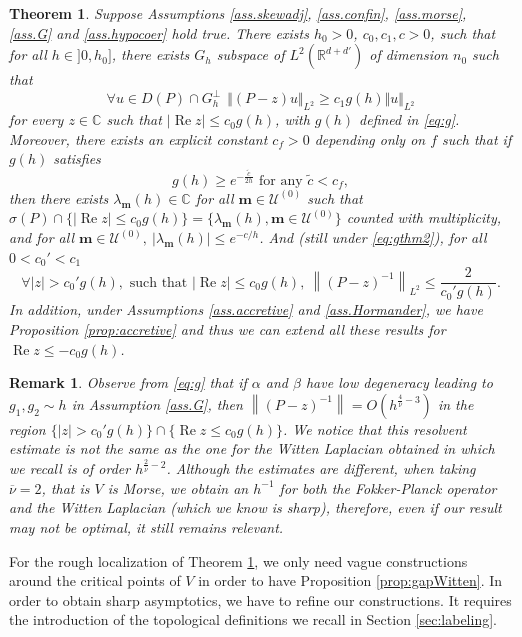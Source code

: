 \documentclass[12pt]{amsart}
\renewcommand{\Re}{\operatorname{Re}}
\newcommand{\C}{\mathbb C}
\newcommand{\R}{\mathbb R}
\numberwithin{equation}{section}
\numberwithin{figure}{section}
\def\m{\mathbf{m}}
\newcommand{\vvert}[1]{\left\lVert#1\right\rVert}
\newtheorem{theorem}{Theorem}
\newtheorem{remark}[defin]{Remark}
\def\uuu{{\mathcal U}}\def\vvv{{\mathcal V}}\def\www{{\mathcal W}}\def\xxx{{\mathcal X}}
\begin{document}
\begin{theorem}\label{thm:1}
Suppose Assumptions \ref{ass.skewadj}, \ref{ass.confin}, \ref{ass.morse}, \ref{ass.G} and \ref{ass.hypocoer} hold true. There exists $h_0>0$, $c_0,c_1,c>0$, such that for all $h\in]0,h_0]$, there exists $G_h$ subspace of $L^2(\R^{d+d'})$ of dimension $n_0$ such that
$$
\forall u\in D(P)\cap G_h^\bot\ \ \Vert (P-z)u\Vert_{L^2}\geq c_1g(h)\Vert u\Vert_{L^2}
$$
for every $z\in\C$ such that $|\Re z|\leq c_0g(h)$, with $g(h)$ defined in \eqref{eq:g}. Moreover, there exists an explicit constant $c_f>0$ depending only on $f$ such that if $g(h)$ satisfies
\begin{equation}\label{eq:gthm2}
g(h)\geq e^{-\frac{\tilde c}{2h}}\mbox{ for any } \tilde c<c_f,
\end{equation}
then there exists $\lambda_\m(h)\in\C$ for all $\m\in\uuu^{(0)}$ such that $\sigma(P)\cap\{|\Re z|\leq c_0g(h)\}=\{\lambda_\m(h),\m\in\uuu^{(0)}\}$ counted with multiplicity, and for all $\m\in\uuu^{(0)},\ |\lambda_\m(h)|\leq e^{-c/h}$. And (still under \eqref{eq:gthm2}), for all $0<c_0'<c_1$
\begin{equation*}
\forall |z|>c_0'g(h),\mbox{ such that }|\Re z|\leq c_0g(h),\ \vvert{(P-z)^{-1}}_{L^2}\leq\frac{2}{c_0'g(h)}.
\end{equation*}
In addition, under Assumptions \ref{ass.accretive} and \ref{ass.Hormander}, we have Proposition \ref{prop:accretive} and thus we can extend all these results for $\Re z \leq -c_0g(h)$.
\end{theorem}

\begin{remark}
    Observe from \eqref{eq:g} that if $\alpha$ and $\beta$ have low degeneracy leading to $g_1,g_2\sim h$ in Assumption \ref{ass.G}, then $\vvert{(P-z)^{-1}} = O(h^{\frac{4}{\overline{\nu}}-3})$ in the region $\{|z|>c_0'g(h)\}\cap\{\Re z\leq c_0g(h)\}$. We notice that this resolvent estimate is not the same as the one for the Witten Laplacian obtained in \cite{De25_1} which we recall is of order $h^{\frac{2}{\overline{\nu}}-2}$. Although the estimates are different, when taking $\overline{\nu} = 2$, that is $V$ is Morse, we obtain an $h^{-1}$ for both the Fokker-Planck operator and the Witten Laplacian (which we know is sharp), therefore, even if our result may not be optimal, it still remains relevant.
\end{remark}

For the rough localization of Theorem \ref{thm:1}, we only need vague constructions around the critical points of $V$ in order to have Proposition \ref{prop:gapWitten}. In order to obtain sharp asymptotics, we have to refine our constructions. It requires the introduction of the topological definitions we recall in Section \ref{sec:labeling}.
\end{document}
